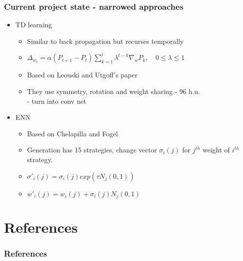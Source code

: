 \documentclass{beamer}
\begin{document}
\begin{frame}
\frametitle{Current project state - narrowed approaches}
\begin{itemize}
\item<1->TD learning
\begin{itemize}
\item<2,3>Similar to back propagation but recurses temporally
\item<3>$\Delta_{w_t} = \alpha(P_{t+1} - P_t)\sum_{k=1}^{t} \lambda^{t-k}\nabla_w P_k  ,\quad 0 \leq \lambda \leq 1 $
\item<4->Based on Leouski and Utgoff's paper\cite{Leouski96whata}
\item<5>They use symmetry, rotation and weight sharing - 96 h.u.\\ - turn into conv net
\end{itemize}
\item<6->ENN
\begin{itemize}
\item<7-11>Based on Chelapilla and Fogel\cite{chellapilla1999evolution}
\item<8-10>Generation has 15 strategies, change vector $\sigma_i(j)$ for $j^{th}$ weight of $i^{th}$ strategy.
\item<9>$\sigma'_i(j) = \sigma_i(j) exp(\tau N_j(0,1))$
\item<10>$w'_i(j) = w_i(j) + \sigma_i(j)N_j(0,1)$
\end{itemize}
\end{itemize}
\end{frame}

\section{References}

\begin{frame}%
        \frametitle{References}
        
\end{frame}
\end{document}
